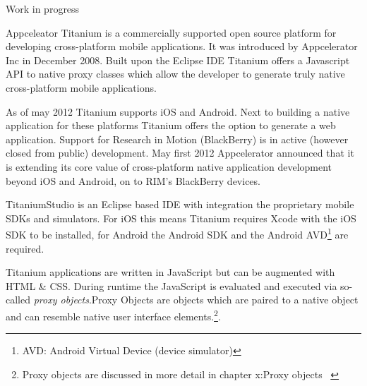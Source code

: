 Work in progress

Appceleator Titanium is a commercially supported open source platform for developing cross-platform mobile applications. It was introduced by Appcelerator Inc in December 2008. Built upon the Eclipse IDE Titanium offers a Javascript API to native proxy classes which allow the developer to generate truly native cross-platform mobile applications. 

As of may 2012 Titanium supports iOS and Android. Next to building a native application for these platforms Titanium offers the option to generate a web application. 
Support for Research in Motion (BlackBerry) is in active (however closed from public) development. May first 2012 Appcelerator announced that it is extending its core value of cross-platform native application development beyond iOS and Android, on to RIM's BlackBerry devices.\cite{Asher2012}

TitaniumStudio is an Eclipse based IDE with integration the proprietary mobile SDKs and simulators. For iOS this means Titanium requires Xcode with the iOS SDK to be installed, for Android the Android SDK and the Android AVD\footnote{AVD: Android Virtual Device (device simulator)} are required.

Titanium applications are written in JavaScript but can be augmented with HTML \& CSS. During runtime the JavaScript is evaluated and executed via so-called \emph{proxy objects}.Proxy Objects are objects which are paired to a native object and can resemble native user interface elements.\footnote{Proxy objects are discussed in more detail in chapter x:Proxy objects \   }.


